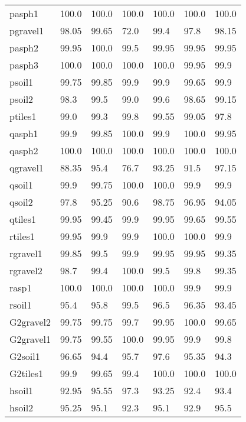 \begin{table}
\begin{center}
\begin{adjustbox}{totalheight=\baselineskip}
\begin{tabular}{|l|l|l|l|l|l|l|}
		pasph1 & 100.0 & 100.0 & 100.0 & 100.0 & 100.0 & 100.0\\
		pgravel1 & 98.05 & 99.65 & \cellcolor{red!20}72.0 & 99.4 & 97.8 & 98.15\\
		pasph2 & 99.95 & 100.0 & 99.5 & 99.95 & 99.95 & 99.95\\
		pasph3 & 100.0 & 100.0 & 100.0 & 100.0 & 99.95 & 99.9\\
		psoil1 & 99.75 & 99.85 & 99.9 & 99.9 & 99.65 & 99.9\\
		psoil2 & 98.3 & 99.5 & 99.0 & 99.6 & 98.65 & 99.15\\
		ptiles1 & 99.0 & 99.3 & 99.8 & 99.55 & 99.05 & 97.8\\
		qasph1 & 99.9 & 99.85 & 100.0 & 99.9 & 100.0 & 99.95\\
		qasph2 & 100.0 & 100.0 & 100.0 & 100.0 & 100.0 & 100.0\\
		qgravel1 & \cellcolor{red!20}88.35 & 95.4 & \cellcolor{red!20}76.7 & \cellcolor{red!20}93.25 & \cellcolor{red!20}91.5 & 97.15\\
		qsoil1 & 99.9 & 99.75 & 100.0 & 100.0 & 99.9 & 99.9\\
		qsoil2 & 97.8 & 95.25 & \cellcolor{red!20}90.6 & 98.75 & 96.95 & \cellcolor{red!20}94.05\\
		qtiles1 & 99.95 & 99.45 & 99.9 & 99.95 & 99.65 & 99.55\\
		rtiles1 & 99.95 & 99.9 & 99.9 & 100.0 & 100.0 & 99.9\\
		rgravel1 & 99.85 & 99.5 & 99.9 & 99.95 & 99.95 & 99.35\\
		rgravel2 & 98.7 & 99.4 & 100.0 & 99.5 & 99.8 & 99.35\\
		rasp1 & 100.0 & 100.0 & 100.0 & 100.0 & 99.9 & 99.9\\
		rsoil1 & 95.4 & 95.8 & 99.5 & 96.5 & 96.35 & \cellcolor{red!20}93.45\\
		G2gravel2 & 99.75 & 99.75 & 99.7 & 99.95 & 100.0 & 99.65\\
		G2gravel1 & 99.75 & 99.55 & 100.0 & 99.95 & 99.9 & 99.8\\
		G2soil1 & 96.65 & \cellcolor{red!20}94.4 & 95.7 & 97.6 & 95.35 & \cellcolor{red!20}94.3\\
		G2tiles1 & 99.9 & 99.65 & 99.4 & 100.0 & 100.0 & 100.0\\
		hsoil1 & \cellcolor{red!20}92.95 & 95.55 & 97.3 & \cellcolor{red!20}93.25 & \cellcolor{red!20}92.4 & \cellcolor{red!20}93.4\\
		hsoil2 & 95.25 & 95.1 & \cellcolor{red!20}92.3 & 95.1 & \cellcolor{red!20}92.9 & 95.5\\

\end{tabular}
\end{adjustbox}
\end{center}
\end{table}

